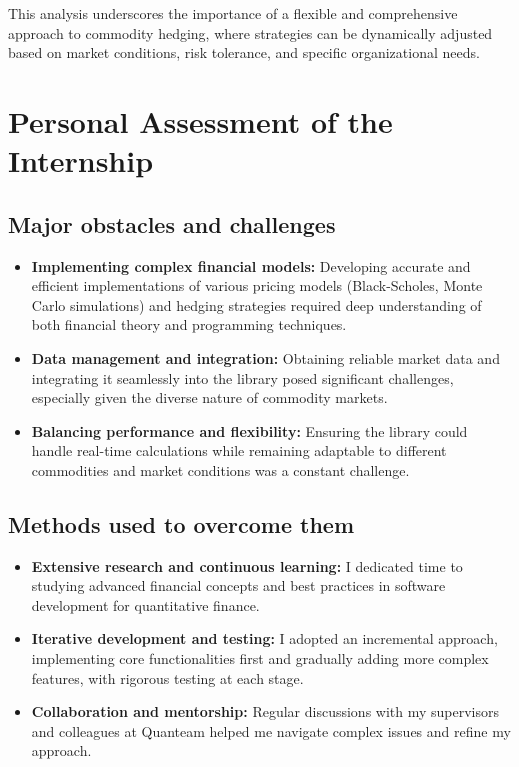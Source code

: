\documentclass[12pt]{article}
\begin{document}
This analysis underscores the importance of a flexible and comprehensive approach to commodity hedging, where strategies can be dynamically adjusted based on market conditions, risk tolerance, and specific organizational needs.

\section{Personal Assessment of the Internship}

\subsection{Major obstacles and challenges}

\begin{itemize}
    \item \textbf{Implementing complex financial models:} Developing accurate and efficient implementations of various pricing models (Black-Scholes, Monte Carlo simulations) and hedging strategies required deep understanding of both financial theory and programming techniques.
    \item \textbf{Data management and integration:} Obtaining reliable market data and integrating it seamlessly into the library posed significant challenges, especially given the diverse nature of commodity markets.
    \item \textbf{Balancing performance and flexibility:} Ensuring the library could handle real-time calculations while remaining adaptable to different commodities and market conditions was a constant challenge.
\end{itemize}

\subsection{Methods used to overcome them}

\begin{itemize}
    \item \textbf{Extensive research and continuous learning:} I dedicated time to studying advanced financial concepts and best practices in software development for quantitative finance.
    \item \textbf{Iterative development and testing:} I adopted an incremental approach, implementing core functionalities first and gradually adding more complex features, with rigorous testing at each stage.
    \item \textbf{Collaboration and mentorship:} Regular discussions with my supervisors and colleagues at Quanteam helped me navigate complex issues and refine my approach.
\end{itemize}
\end{document}
